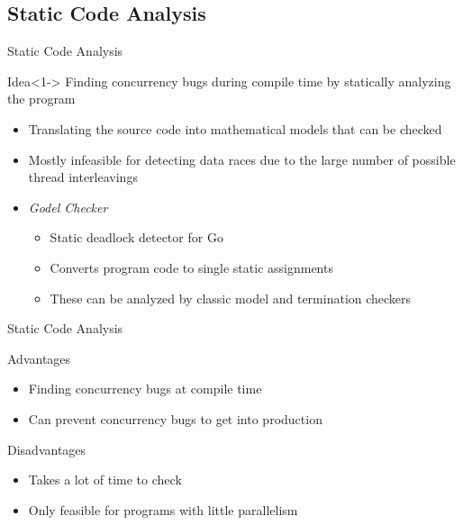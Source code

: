 \documentclass[english,aspectratio=43,t]{beamer}
\begin{document}
\subsection{Static Code Analysis}
\frame\sectionpage

\begin{frame}{Static Code Analysis}
    \begin{block}{Idea}<1->
        Finding concurrency bugs during compile time by statically analyzing the program
    \end{block}
    \begin{itemize}
        \item<2-> Translating the source code into mathematical models that can be checked
        \item<3-> Mostly infeasible for detecting data races due to the large number of possible thread interleavings
        \item<4-> \emph{Godel Checker}~\cite{godelChecker}
        \begin{itemize}
            \item Static deadlock detector for Go
            \item Converts program code to single static assignments
            \item These can be analyzed by classic model and termination checkers
        \end{itemize}
    \end{itemize}
\end{frame}

\begin{frame}[c]{Static Code Analysis}
    \centering
    \begin{exampleblock}{Advantages}
        \begin{itemize}
            \item Finding concurrency bugs at compile time
            \item Can prevent concurrency bugs to get into production
        \end{itemize}
    \end{exampleblock}
    \begin{alertblock}{Disadvantages}
        \begin{itemize}
            \item Takes a lot of time to check
            \item Only feasible for programs with little parallelism
        \end{itemize}
    \end{alertblock}
\end{frame}
\end{document}
